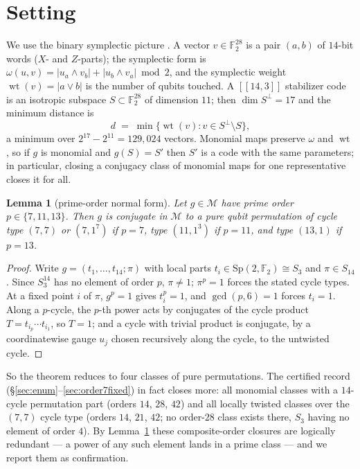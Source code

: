 \documentclass[11pt]{amsart}
\newcommand{\FF}{\mathbb{F}_{2}}
\newcommand{\wt}{\operatorname{wt}}
\newcommand{\Sperp}{S^{\perp}}
\newcommand{\Mon}{\mathcal{M}}
\theoremstyle{plain}
\newtheorem{lemma}[theorem]{Lemma}
\theoremstyle{definition}
\theoremstyle{remark}
\begin{document}
\section{Setting}\label{sec:setting}

We use the binary symplectic picture \cite{CRSS,Gottesman97}. A vector
$v\in\FF^{28}$ is a pair $(a,b)$ of $14$-bit words ($X$- and $Z$-parts);
the symplectic form is $\omega(u,v)=|u_{a}\wedge v_{b}|+|u_{b}\wedge
v_{a}| \bmod 2$, and the symplectic weight $\wt(v)=|a\vee b|$ is the
number of qubits touched. A $[[14,3]]$ stabilizer code is an isotropic
subspace $S\subset\FF^{28}$ of dimension $11$; then
$\dim\Sperp=17$ and the minimum distance is
\[
  d \;=\; \min\{\wt(v): v\in\Sperp\setminus S\},
\]
a minimum over $2^{17}-2^{11}=129{,}024$ vectors. Monomial maps preserve
$\omega$ and $\wt$, so if $g$ is monomial and $g(S)=S'$ then $S'$ is a
code with the same parameters; in particular, closing a conjugacy class of
monomial maps for one representative closes it for all.

\begin{lemma}[prime-order normal form]\label{lem:normalform}
Let $g\in\Mon$ have prime order $p\in\{7,11,13\}$. Then $g$ is conjugate
in $\Mon$ to a pure qubit permutation of cycle type $(7,7)$ or
$(7,1^{7})$ if $p=7$, type $(11,1^{3})$ if $p=11$, and type $(13,1)$ if
$p=13$.
\end{lemma}

\begin{proof}
Write $g=(t_{1},\dots,t_{14};\pi)$ with local parts
$t_{i}\in\mathrm{Sp}(2,\FF)\cong S_{3}$ and $\pi\in S_{14}$. Since
$S_{3}^{14}$ has no element of order $p$, $\pi\neq 1$; $\pi^{p}=1$ forces
the stated cycle types. At a fixed point $i$ of $\pi$, $g^{p}=1$ gives
$t_{i}^{p}=1$, and $\gcd(p,6)=1$ forces $t_{i}=1$. Along a $p$-cycle, the
$p$-th power acts by conjugates of the cycle product
$T=t_{i_{p}}\cdots t_{i_{1}}$, so $T=1$; and a cycle with trivial product
is conjugate, by a coordinatewise gauge $u_{j}$ chosen recursively along
the cycle, to the untwisted cycle.
\end{proof}

So the theorem reduces to four classes of pure permutations. The certified
record (\S\ref{sec:enum}--\ref{sec:order7fixed}) in fact closes more: all
monomial classes with a $14$-cycle permutation part (orders $14$, $28$,
$42$) and all locally twisted classes over the $(7,7)$ cycle type (orders
$14$, $21$, $42$; no order-$28$ class exists there, $S_{3}$ having no
element of order $4$). By Lemma~\ref{lem:normalform} these composite-order
closures are logically redundant --- a power of any such element lands in
a prime class --- and we report them as confirmation.
\end{document}
